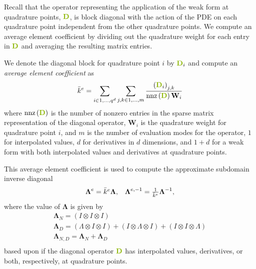 Recall that the operator representing the application of the weak form at quadrature points, ${\color{applegreen}\mathbf{D}}$, is block diagonal with the action of the PDE on each quadrature point independent from the other quadrature points.
We compute an average element coefficient by dividing out the quadrature weight for each entry in ${\color{applegreen}\mathbf{D}}$ and averaging the resulting matrix entries.

\begin{definition}\label{def:averageelementcoefficient}
We denote the diagonal block for quadrature point $i$ by ${\color{applegreen}\mathbf{D}}_i$ and compute an \textit{average element coefficient} as
\begin{equation}
\bar{k}^e = \sum_{i \in 1, ..., q^d} \sum_{j, k \in 1, ..., m} \frac{\left( {\color{applegreen}\mathbf{D}}_{i} \right)_{j, k}}{\text{nnz} \left( {\color{applegreen}\mathbf{D}} \right) \mathbf{W}_i}
\end{equation}
where $\text{nnz} \left( {\color{applegreen}\mathbf{D}} \right)$ is the number of nonzero entries in the sparse matrix representation of the diagonal operator, $\mathbf{W}_i$ is the quadrature weight for quadrature point $i$, and $m$ is the number of evaluation modes for the operator, $1$ for interpolated values, $d$ for derivatives in $d$ dimensions, and $1 + d$ for a weak form with both interpolated values and derivatives at quadrature points.
\end{definition}

This average element coefficient is used to compute the approximate subdomain inverse diagonal
\begin{equation}
\begin{array}{c c}
\boldsymbol{\Lambda}^e = \bar{k}^e \boldsymbol{\Lambda},  &  \boldsymbol{\Lambda}^{e, -1} = \frac{1}{\bar{k}^e} \boldsymbol{\Lambda}^{-1},
\end{array}
\end{equation}
where the value of $\mathbf{\Lambda}$ is given by
\begin{equation}
\begin{array}{c}
\boldsymbol{\Lambda}_N      = \left( I \otimes I \otimes I \right)  \\
\boldsymbol{\Lambda}_D      = \left( \Lambda \otimes I \otimes I\right) + \left( I \otimes \Lambda \otimes I\right) + \left( I \otimes I \otimes \Lambda \right)  \\
\boldsymbol{\Lambda}_{N, D} = \boldsymbol{\Lambda}_N + \boldsymbol{\Lambda}_D  \\
\end{array}
\end{equation}
based upon if the diagonal operator ${\color{applegreen}\mathbf{D}}$ has interpolated values, derivatives, or both, respectively, at quadrature points.

